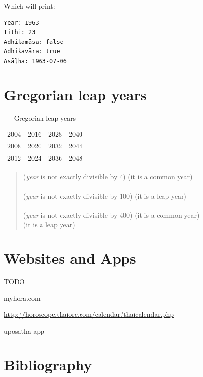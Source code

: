 \documentclass[11pt,oneside]{memoir-article}
\begin{document}
Which will print:

\begin{verbatim}
Year: 1963
Tithi: 23
Adhikamāsa: false
Adhikavāra: true
Āsāḷha: 1963-07-06
\end{verbatim}

\chapter{Gregorian leap years}
\label{sec-6}

\begin{table}[h]
\caption{\label{tbl-cycle-leap-years} Gregorian leap years}
\centering
\begin{tabular}{rrrr}
2004 & 2016 & 2028 & 2040\\
2008 & 2020 & 2032 & 2044\\
2012 & 2024 & 2036 & 2048\\
\end{tabular}
\end{table}

\begin{quote}
 (\emph{year} is not exactly divisible by 4)  (it is a common year)\\
\\
 (\emph{year} is not exactly divisible by 100)  (it is a leap year)\\
\\
 (\emph{year} is not exactly divisible by 400)  (it is a common year)\\
 (it is a leap year)
\cite{wp-leap-year}
\end{quote}

\backmatter

\chapter{Websites and Apps}
\label{sec-7}

TODO

myhora.com

\url{http://horoscope.thaiorc.com/calendar/thaicalendar.php}

uposatha app

\chapter{Bibliography}
\label{sec-8}
\label{bibliography}



\end{document}
